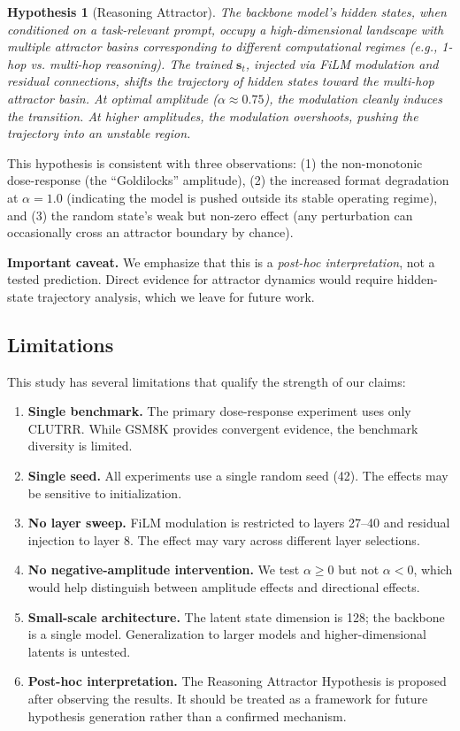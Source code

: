 \documentclass[11pt,a4paper]{article}
\newtheorem{hypothesis}{Hypothesis}
\begin{document}
\begin{hypothesis}[Reasoning Attractor]
The backbone model's hidden states, when conditioned on a task-relevant prompt, occupy a high-dimensional landscape with multiple attractor basins corresponding to different computational regimes (e.g., 1-hop vs. multi-hop reasoning). The trained $\mathbf{s}_t$, injected via FiLM modulation and residual connections, shifts the trajectory of hidden states toward the multi-hop attractor basin. At optimal amplitude ($\alpha \approx 0.75$), the modulation cleanly induces the transition. At higher amplitudes, the modulation overshoots, pushing the trajectory into an unstable region.
\end{hypothesis}

This hypothesis is consistent with three observations: (1) the non-monotonic dose-response (the ``Goldilocks'' amplitude), (2) the increased format degradation at $\alpha = 1.0$ (indicating the model is pushed outside its stable operating regime), and (3) the random state's weak but non-zero effect (any perturbation can occasionally cross an attractor boundary by chance).

\textbf{Important caveat.} We emphasize that this is a \textit{post-hoc interpretation}, not a tested prediction. Direct evidence for attractor dynamics would require hidden-state trajectory analysis, which we leave for future work.

\subsection{Limitations}

This study has several limitations that qualify the strength of our claims:

\begin{enumerate}
    \item \textbf{Single benchmark.} The primary dose-response experiment uses only CLUTRR. While GSM8K provides convergent evidence, the benchmark diversity is limited.
    \item \textbf{Single seed.} All experiments use a single random seed (42). The effects may be sensitive to initialization.
    \item \textbf{No layer sweep.} FiLM modulation is restricted to layers 27--40 and residual injection to layer 8. The effect may vary across different layer selections.
    \item \textbf{No negative-amplitude intervention.} We test $\alpha \geq 0$ but not $\alpha < 0$, which would help distinguish between amplitude effects and directional effects.
    \item \textbf{Small-scale architecture.} The latent state dimension is 128; the backbone is a single model. Generalization to larger models and higher-dimensional latents is untested.
    \item \textbf{Post-hoc interpretation.} The Reasoning Attractor Hypothesis is proposed after observing the results. It should be treated as a framework for future hypothesis generation rather than a confirmed mechanism.
\end{enumerate}
\end{document}
